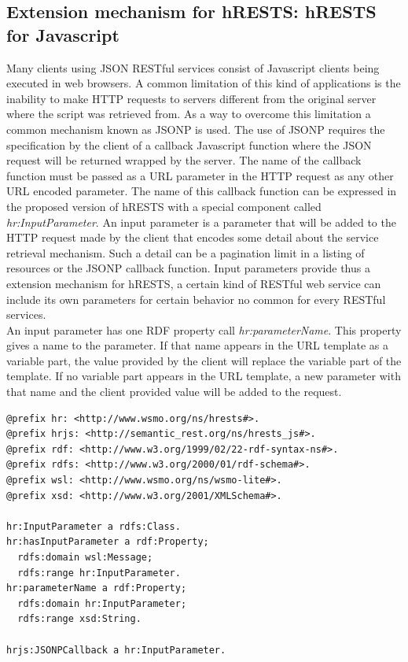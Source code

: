 \subsection{Extension mechanism for hRESTS: hRESTS for Javascript}
Many clients using JSON RESTful services consist of Javascript clients being executed in web browsers. A common limitation of this kind of applications is the inability to make HTTP requests to servers different from the original server where the script was retrieved from. As a way to overcome this limitation a common mechanism known as JSONP is used. The use of JSONP requires the specification by the client of a callback Javascript function where the JSON request will be returned wrapped by the server. The name of the callback function must be passed as a URL parameter in the HTTP request as any other URL encoded parameter.  The name of this callback function can be expressed in the proposed version of hRESTS with a special component called \emph{hr:InputParameter}. An input parameter  is a parameter that will be added to the HTTP request made by the client that encodes some detail about the service retrieval mechanism. Such a detail can be a pagination limit in a listing of resources or the JSONP callback function. Input parameters provide thus a extension mechanism for hRESTS, a certain kind of RESTful web service can include its own parameters for certain behavior no common for every RESTful services.\\
An input parameter has one RDF property call \emph{hr:parameterName}. This property gives a name to the parameter. If that name appears in the URL template as a variable part, the value provided by the client will replace the variable part of the template. If no variable part appears in the URL template, a new parameter with that name and the client provided value will be added to the request. 
\vspace{5 mm}
\begin{lstlisting}
@prefix hr: <http://www.wsmo.org/ns/hrests#>. 
@prefix hrjs: <http://semantic_rest.org/ns/hrests_js#>. 
@prefix rdf: <http://www.w3.org/1999/02/22-rdf-syntax-ns#>. 
@prefix rdfs: <http://www.w3.org/2000/01/rdf-schema#>. 
@prefix wsl: <http://www.wsmo.org/ns/wsmo-lite#>. 
@prefix xsd: <http://www.w3.org/2001/XMLSchema#>. 

hr:InputParameter a rdfs:Class.
hr:hasInputParameter a rdf:Property;
  rdfs:domain wsl:Message;
  rdfs:range hr:InputParameter.
hr:parameterName a rdf:Property;
  rdfs:domain hr:InputParameter;
  rdfs:range xsd:String.

hrjs:JSONPCallback a hr:InputParameter.
\end{lstlisting} \vspace{5 mm}

